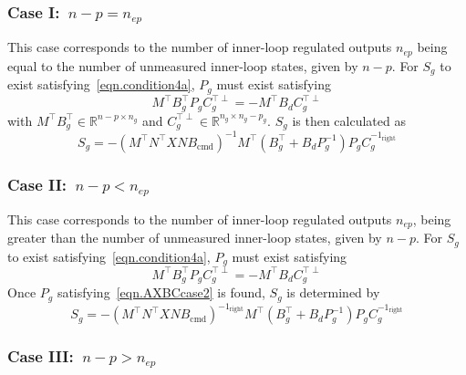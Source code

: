 \documentclass[journal]{IEEEtran}
\theoremstyle{innercustomthm}
\begin{document}
  \subsubsection{Case I:\ \texorpdfstring{$n-p=n_{ep}$}{n-p=nep}}

  This case corresponds to the number of inner-loop regulated outputs $n_{ep}$ being equal to the number of unmeasured inner-loop states, given by $n-p$.
  For $S_{g}$ to exist satisfying\ \eqref{eqn.condition4a}, $P_{g}$ must exist satisfying
  \begin{equation}
    \label{eqn.AXBCcase1}
    M^{\top}B_{g}^{\top}P_{g}C_{g}^{\top\perp} = -M^{\top}B_{d}C_{g}^{\top\perp}
  \end{equation}
  with $M^{\top}B_{g}^{\top}\in\mathbb{R}^{n-p\times n_{g}}$ and $C_{g}^{\top\perp}\in\mathbb{R}^{n_{g}\times n_{g}-p_{g}}$.
  $S_{g}$ is then calculated as
  {%
    \small
    \begin{equation}
      \label{eqn.SgCaseI}
      S_{g} = - (M^{\top}N^{\top}XNB_{\text{cmd}})^{-1}M^{\top}(B_{g}^{\top}+B_{d}P_{g}^{-1})P_{g}C_{g}^{-1_{\text{right}}}
    \end{equation}
  }%

  \subsubsection{Case II:\ \texorpdfstring{$n-p<n_{ep}$}{n-p<nep}}

  This case corresponds to the number of inner-loop regulated outputs $n_{ep}$, being greater than the number of unmeasured inner-loop states, given by $n-p$.
  For $S_{g}$ to exist satisfying\ \eqref{eqn.condition4a}, $P_{g}$ must exist satisfying
  \begin{equation}
    \label{eqn.AXBCcase2}
    M^{\top}B_{g}^{\top}P_{g}C_{g}^{\top\perp} = - M^{\top}B_{d}C_{g}^{\top\perp}
  \end{equation}
  Once $P_{g}$ satisfying\ \eqref{eqn.AXBCcase2} is found, $S_{g}$ is determined by
  {%
    \small
    \begin{equation}
      \label{eqn.SgCaseII}
      S_{g} = - (M^{\top}N^{\top}XNB_{\text{cmd}})^{-1_{\text{right}}}M^{\top}(B_{g}^{\top}+B_{d}P_{g}^{-1})P_{g}C_{g}^{-1_{\text{right}}}
    \end{equation}
  }%

  \subsubsection{Case III:\ \texorpdfstring{$n-p>n_{ep}$}{n-p>nep}}
\end{document}
